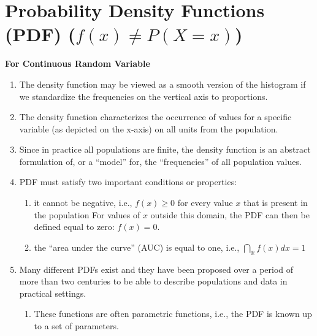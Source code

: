 \section{Probability Density Functions (PDF) ($f(x) \neq P(X = x)$)}

\textbf{For Continuous Random Variable}

\begin{enumerate}
    \item The density function may be viewed as a smooth version of the histogram if we standardize the frequencies on the vertical axis to proportions. 
    \hfill \cite{statistics/book/Statistics-for-Data-Scientists/Maurits-Kaptein}

    \item The density function characterizes the occurrence of values for a specific variable (as depicted on the x-axis) on all units from the population. 
    \hfill \cite{statistics/book/Statistics-for-Data-Scientists/Maurits-Kaptein}

    \item Since in practice all populations are finite, the density function is an abstract formulation of, or a “model” for, the “frequencies” of all population values.
    \hfill \cite{statistics/book/Statistics-for-Data-Scientists/Maurits-Kaptein}

    \item PDF must satisfy two important conditions or properties:
    \hfill \cite{statistics/book/Statistics-for-Data-Scientists/Maurits-Kaptein}
    \begin{enumerate}
        \item  it cannot be negative, i.e., $f (x) \geq 0$ for every value $x$ that is present in the population
        For values of $x$ outside this domain, the PDF can then be defined equal to zero: $f (x) = 0$.
        \hfill \cite{statistics/book/Statistics-for-Data-Scientists/Maurits-Kaptein}

        \item  the “area under the curve” (AUC) is equal to one, i.e., $\dint_{\mathbb{R}} f(x) dx = 1$
        \hfill \cite{statistics/book/Statistics-for-Data-Scientists/Maurits-Kaptein}
    \end{enumerate}

    \item Many different PDFs exist and they have been proposed over a period of more than two centuries to be able to describe populations and data in practical settings.
    \hfill \cite{statistics/book/Statistics-for-Data-Scientists/Maurits-Kaptein}
    \begin{enumerate}
        \item These functions are often parametric functions, i.e., the PDF is known up to a set of parameters.
        \hfill \cite{statistics/book/Statistics-for-Data-Scientists/Maurits-Kaptein}


\end{enumerate}
\end{enumerate}
